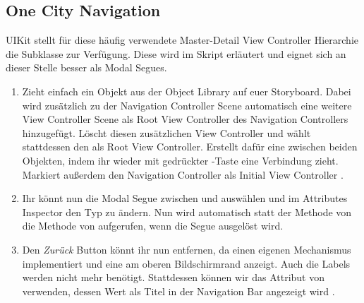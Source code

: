 \documentclass[parskip=half, final]{scrreprt}
\begin{document}
\begin{lecture}


\section{One City Navigation}

UIKit stellt für diese häufig verwendete Master-Detail View Controller Hierarchie die Subklasse  zur Verfügung. Diese wird im Skript erläutert und eignet sich an dieser Stelle besser als Modal Segues.

\begin{enumerate}

\item Zieht einfach ein  Objekt aus der Object Library auf euer Storyboard. Dabei wird zusätzlich zu der Navigation Controller Scene automatisch eine weitere View Controller Scene als Root View Controller des Navigation Controllers hinzugefügt. Löscht diesen zusätzlichen View Controller und wählt stattdessen den  als Root View Controller. Erstellt dafür eine  zwischen beiden Objekten, indem ihr wieder mit gedrückter \keys{\ctrlkey}-Taste eine Verbindung zieht. Markiert außerdem den Navigation Controller als Initial View Controller .


\item Ihr könnt nun die Modal Segue zwischen  und  auswählen und im Attributes Inspector den Typ zu  ändern. Nun wird automatisch statt der  Methode von  die  Methode von  aufgerufen, wenn die Segue ausgelöst wird.

\item Den \emph{Zurück} Button könnt ihr nun entfernen, da  einen eigenen Mechanismus implementiert und eine  am oberen Bildschirmrand anzeigt. Auch die Labels werden nicht mehr benötigt. Stattdessen können wir das  Attribut von  verwenden, dessen Wert als Titel in der Navigation Bar angezeigt wird .


\end{enumerate}
\end{lecture}
\end{document}
